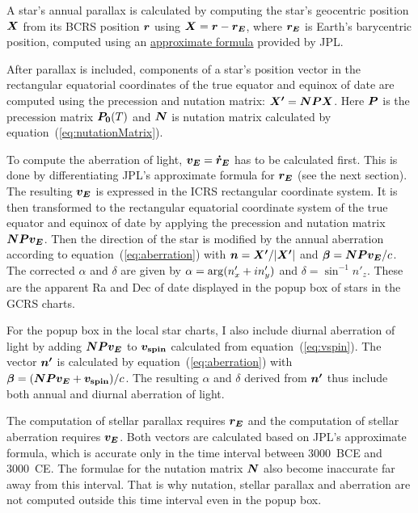 \documentclass[12pt]{article}
\newcommand{\ve}[1]{\mbox{\boldmath $#1$}}
\begin{document}
A star's annual parallax is calculated by computing the star's geocentric 
position $\ve{X}$ from its BCRS position $\ve{r}$ using $\ve{X}=\ve{r}-\ve{r_E}$, 
where $\ve{r_E}$ is Earth's barycentric position, computed using 
an \href{https://ssd.jpl.nasa.gov/?planet_pos}{approximate formula} provided by JPL. 

After parallax is included, components of a star's position vector in the 
rectangular equatorial coordinates of the true equator and equinox 
of date are computed using the precession and nutation matrix: 
$\ve{X'}=\ve{NPX}$. Here $\ve{P}$ is the precession matrix $\ve{P_0}(T)$ and 
$\ve{N}$ is nutation matrix calculated by equation~(\ref{eq:nutationMatrix}).

To compute the aberration of light, $\ve{v_E}=\ve{\dot{r}_E}$ has to be calculated 
first. This is done by differentiating JPL's approximate formula for $\ve{r_E}$ 
(see the next section). The resulting $\ve{v_E}$ is expressed in the ICRS rectangular 
coordinate system. It is then transformed to the rectangular equatorial coordinate system 
of the true equator and equinox of date by applying the precession and 
nutation matrix $\ve{NPv_E}$. Then the direction 
of the star is modified by the annual aberration according to equation~(\ref{eq:aberration}) 
with $\ve{n}=\ve{X'}/|\ve{X'}|$ and 
$\ve{\beta} = \ve{N P v_E}/c$. The corrected $\alpha$ and $\delta$ are given by 
$\alpha = {\rm arg}(n'_x + i n'_y)$ and $\delta = \sin^{-1} n'_z$. These are the 
apparent Ra and Dec of date displayed in the popup box of stars in the GCRS charts. 

For the popup box in the local star charts, I also include diurnal aberration of 
light by adding $\ve{NPv_E}$ to $\ve{v_{\rm spin}}$ calculated from 
equation~(\ref{eq:vspin}). The vector $\ve{n'}$ is calculated by 
equation~(\ref{eq:aberration}) with $\ve{\beta}=(\ve{NPv_E}+\ve{v_{\rm spin}})/c$. 
The resulting $\alpha$ and $\delta$ derived from $\ve{n'}$ thus include both 
annual and diurnal aberration of light. 

The computation of stellar parallax requires $\ve{r_E}$ and the computation 
of stellar aberration requires $\ve{v_E}$. Both vectors are calculated based on 
JPL's approximate formula, which is accurate only in the time interval between 
3000~BCE and 3000~CE. The formulae for the nutation matrix $\ve{N}$ also 
become inaccurate far away from this interval. That is why nutation, stellar parallax 
and aberration are not computed outside this time interval even in the popup box.
\end{document}
